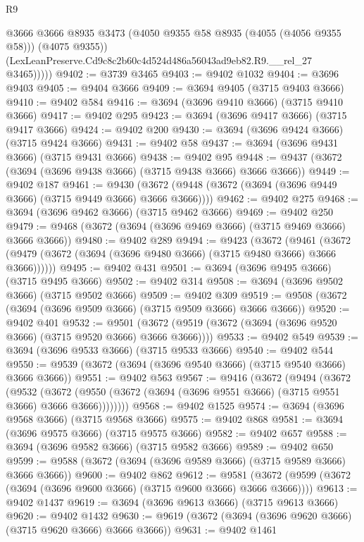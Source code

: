 \begin{lexlean}{R9}
\begin{coremodule}
              @3666
              @3666
              @8935
              @3473
              (@4050 @9355 @58 @8935 (@4055 (@4056 @9355 @58)))
              (@4075 @9355))
            (LexLeanPreserve.Cd9c8c2b60c4d524d486a56043ad9eb82.R9.__rel_27 @3465)))))
@9402 := @3739 @3465
@9403 := @9402 @1032
@9404 := @3696 @9403
@9405 := @9404 @3666
@9409 := @3694 @9405 (@3715 @9403 @3666)
@9410 := @9402 @584
@9416 := @3694 (@3696 @9410 @3666) (@3715 @9410 @3666)
@9417 := @9402 @295
@9423 := @3694 (@3696 @9417 @3666) (@3715 @9417 @3666)
@9424 := @9402 @200
@9430 := @3694 (@3696 @9424 @3666) (@3715 @9424 @3666)
@9431 := @9402 @58
@9437 := @3694 (@3696 @9431 @3666) (@3715 @9431 @3666)
@9438 := @9402 @95
@9448 := @9437 (@3672 (@3694 (@3696 @9438 @3666) (@3715 @9438 @3666) @3666 @3666))
@9449 := @9402 @187
@9461 := @9430 (@3672 (@9448 (@3672 (@3694 (@3696 @9449 @3666) (@3715 @9449 @3666) @3666 @3666))))
@9462 := @9402 @275
@9468 := @3694 (@3696 @9462 @3666) (@3715 @9462 @3666)
@9469 := @9402 @250
@9479 := @9468 (@3672 (@3694 (@3696 @9469 @3666) (@3715 @9469 @3666) @3666 @3666))
@9480 := @9402 @289
@9494 := @9423
    (@3672
      (@9461 (@3672 (@9479 (@3672 (@3694 (@3696 @9480 @3666) (@3715 @9480 @3666) @3666 @3666))))))
@9495 := @9402 @431
@9501 := @3694 (@3696 @9495 @3666) (@3715 @9495 @3666)
@9502 := @9402 @314
@9508 := @3694 (@3696 @9502 @3666) (@3715 @9502 @3666)
@9509 := @9402 @309
@9519 := @9508 (@3672 (@3694 (@3696 @9509 @3666) (@3715 @9509 @3666) @3666 @3666))
@9520 := @9402 @401
@9532 := @9501 (@3672 (@9519 (@3672 (@3694 (@3696 @9520 @3666) (@3715 @9520 @3666) @3666 @3666))))
@9533 := @9402 @549
@9539 := @3694 (@3696 @9533 @3666) (@3715 @9533 @3666)
@9540 := @9402 @544
@9550 := @9539 (@3672 (@3694 (@3696 @9540 @3666) (@3715 @9540 @3666) @3666 @3666))
@9551 := @9402 @563
@9567 := @9416
    (@3672
      (@9494
        (@3672
          (@9532
            (@3672 (@9550 (@3672 (@3694 (@3696 @9551 @3666) (@3715 @9551 @3666) @3666 @3666))))))))
@9568 := @9402 @1525
@9574 := @3694 (@3696 @9568 @3666) (@3715 @9568 @3666)
@9575 := @9402 @868
@9581 := @3694 (@3696 @9575 @3666) (@3715 @9575 @3666)
@9582 := @9402 @657
@9588 := @3694 (@3696 @9582 @3666) (@3715 @9582 @3666)
@9589 := @9402 @650
@9599 := @9588 (@3672 (@3694 (@3696 @9589 @3666) (@3715 @9589 @3666) @3666 @3666))
@9600 := @9402 @862
@9612 := @9581 (@3672 (@9599 (@3672 (@3694 (@3696 @9600 @3666) (@3715 @9600 @3666) @3666 @3666))))
@9613 := @9402 @1437
@9619 := @3694 (@3696 @9613 @3666) (@3715 @9613 @3666)
@9620 := @9402 @1432
@9630 := @9619 (@3672 (@3694 (@3696 @9620 @3666) (@3715 @9620 @3666) @3666 @3666))
@9631 := @9402 @1461

\end{coremodule}
\end{lexlean}
